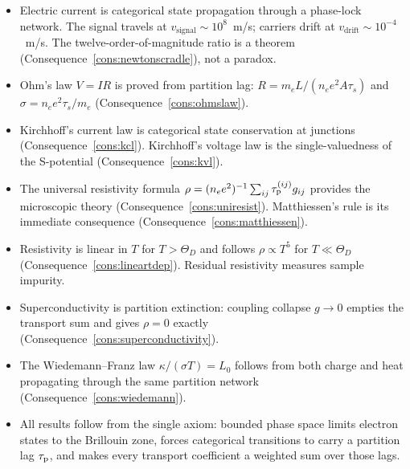 \bigskip
\begin{tcolorbox}[colback=crownblue!5, colframe=crownblue!60!black,
                  title={\textbf{Chapter 18 Summary}}]
\begin{itemize}[noitemsep]
  \item Electric current is categorical state propagation through a
    phase-lock network.  The signal travels at $v_{\mathrm{signal}} \sim
    10^8$~m/s; carriers drift at $v_{\mathrm{drift}} \sim 10^{-4}$~m/s.
    The twelve-order-of-magnitude ratio is a theorem
    (Consequence~\ref{cons:newtonscradle}), not a paradox.

  \item Ohm's law $V = IR$ is proved from partition lag: $R = m_e L/(n_e
    e^2 A\tau_s)$ and $\sigma = n_e e^2\tau_s/m_e$
    (Consequence~\ref{cons:ohmslaw}).

  \item Kirchhoff's current law is categorical state conservation at
    junctions (Consequence~\ref{cons:kcl}).  Kirchhoff's voltage law is the
    single-valuedness of the S-potential (Consequence~\ref{cons:kvl}).

  \item The universal resistivity formula
    $\rho = (n_e e^2)^{-1}\sum_{ij}\tau_{\mathrm{p}}^{(ij)}g_{ij}$ provides the
    microscopic theory (Consequence~\ref{cons:uniresist}).  Matthiessen's
    rule is its immediate consequence (Consequence~\ref{cons:matthiessen}).

  \item Resistivity is linear in $T$ for $T > \Theta_D$ and follows
    $\rho \propto T^5$ for $T \ll \Theta_D$
    (Consequence~\ref{cons:lineartdep}).  Residual resistivity measures
    sample impurity.

  \item Superconductivity is partition extinction: coupling collapse
    $g \to 0$ empties the transport sum and gives $\rho = 0$ exactly
    (Consequence~\ref{cons:superconductivity}).

  \item The Wiedemann--Franz law $\kappa/(\sigma T) = L_0$ follows from
    both charge and heat propagating through the same partition network
    (Consequence~\ref{cons:wiedemann}).

  \item All results follow from the single axiom: bounded phase space
    limits electron states to the Brillouin zone, forces categorical
    transitions to carry a partition lag $\tau_{\mathrm{p}}$, and makes every
    transport coefficient a weighted sum over those lags.
\end{itemize}
\end{tcolorbox}
